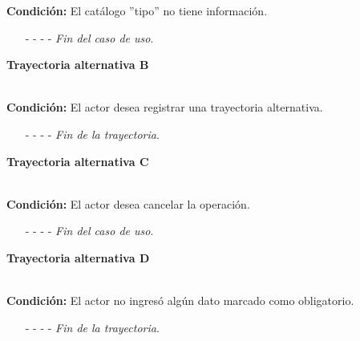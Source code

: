 \noindent \textbf{Condición:} El catálogo ''tipo'' no tiene información.
\begin{enumerate}
	\UCpaso[\UCsist] Muestra el mensaje  en la pantalla  para indicar que no es posible realizar la operación debido a la falta de información necesaria para el sistema.
	\item[- -] - - {\em {Fin del caso de uso}}.%
\end{enumerate}
\hypertarget{CU12-1-1-2:TAB}{\textbf{Trayectoria alternativa B}}\\
\noindent \textbf{Condición:} El actor desea registrar una trayectoria alternativa.
\begin{enumerate}
	\UCpaso[\UCactor] Selecciona la opción ''Alternativa'' del campo ''Tipo''.
	\UCpaso[\UCsist] Muestra el campo de condición.
	\UCpaso[\UCactor] Ingresa la condición de la trayectoria.
	\UCpaso[\UCactor] Selecciona si en la trayectoria se termina el caso de uso.
	\UCpaso Continúa con el paso \ref{CU12.1.1.2-P18} de la trayectoria principal.
	\item[- -] - - {\em {Fin de la trayectoria}}.%
\end{enumerate}
\hypertarget{CU12-1-1-2:TAC}{\textbf{Trayectoria alternativa C}}\\
\noindent \textbf{Condición:} El actor desea cancelar la operación.
\begin{enumerate}
	\UCpaso[\UCactor] Solicita cancelar la operación oprimiendo el botón  de la pantalla .
	\UCpaso[\UCsist] Muestra la pantalla .
	\item[- -] - - {\em {Fin del caso de uso}}.%
\end{enumerate}
\hypertarget{CU12-1-1-2:TAD}{\textbf{Trayectoria alternativa D}}\\
\noindent \textbf{Condición:} El actor no ingresó algún dato marcado como obligatorio.
\begin{enumerate}
	\UCpaso[\UCsist] Muestra el mensaje  señalando el campo que presenta el error en la pantalla .
	\UCpaso Regresa al paso \ref{CU12.1.1.2-P15} de la trayectoria principal.
	\item[- -] - - {\em {Fin de la trayectoria}}.%
\end{enumerate}
